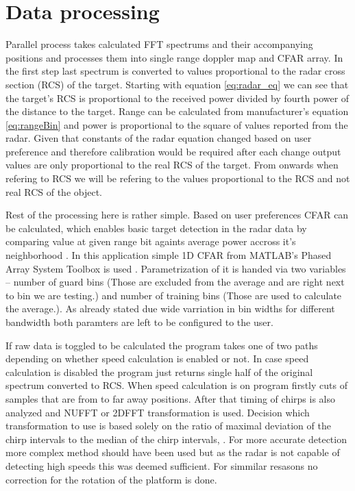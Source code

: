 \section{Data processing}

Parallel process takes calculated FFT spectrums and their accompanying positions and processes them into single range doppler map and CFAR array.
In the first step last spectrum is converted to values proportional to the radar cross section (RCS) of the target.
Starting with equation \ref{eq:radar_eq} we can see that the target's RCS is proportional to the received power divided by fourth power of the distance to the target.
Range can be calculated from manufacturer's equation \ref{eq:rangeBin} and power is proportional to the square of values reported from the radar.
Given that constants of the radar equation changed based on user preference and therefore calibration would be required after each change output values are only proportional to the real RCS of the target.
From onwards when refering to RCS we will be refering to the values proportional to the RCS and not real RCS of the object.

Rest of the processing here is rather simple.
Based on user preferences CFAR can be calculated, which enables basic target detection in the radar data by comparing value at given range bit againts average power accross it's neighborhood \cite{richards2022}.
In this application simple 1D CFAR from MATLAB's Phased Array System Toolbox is used \cite{matlab_cfar}.
Parametrization of it is handed via two variables -- number of guard bins (Those are excluded from the average and are right next to bin we are testing.) and number of training bins (Those are used to calculate the average.).
As already stated due wide varriation in bin widths for different bandwidth both paramters are left to be configured to the user.

If raw data is toggled to be calculated the program takes one of two paths depending on whether speed calculation is enabled or not.
In case speed calculation is disabled the program just returns single half of the original spectrum converted to RCS.
When speed calculation is on program firstly cuts of samples that are from to far away positions.
After that timing of chirps is also analyzed and NUFFT or 2DFFT transformation is used.
Decision which transformation to use is based solely on the ratio of maximal deviation of the chirp intervals to the median of the chirp intervals, .
For more accurate detection more complex method should have been used but as the radar is not capable of detecting high speeds this was deemed sufficient.
For simmilar resasons no correction for the rotation of the platform is done.


